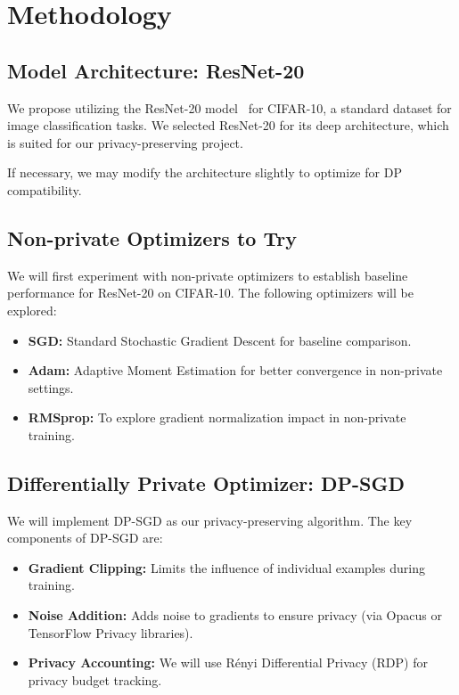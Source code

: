 \documentclass{article}
\begin{document}
    \section{Methodology}\label{sec:methodology}

    \subsection{Model Architecture: ResNet-20}\label{subsec:model-architecture:-resnet-20}

    We propose utilizing the ResNet-20 model~\citet{Idelbayev_ResNet20_CIFAR10} for CIFAR-10,
    a standard dataset for image classification tasks.
    We selected ResNet-20 for its deep architecture,
    which is suited for our privacy-preserving project.

    If necessary, we may modify the architecture slightly to optimize for DP compatibility.

    \subsection{Non-private Optimizers to Try}\label{subsec:non-private-optimizers-to-try}
    We will first experiment with non-private optimizers to establish baseline performance for ResNet-20 on CIFAR-10.
    The following optimizers will be explored:
    \begin{itemize}
        \item \textbf{SGD:} Standard Stochastic Gradient Descent for baseline comparison.
        \item \textbf{Adam:} Adaptive Moment Estimation for better convergence in non-private settings.
        \item \textbf{RMSprop:} To explore gradient normalization impact in non-private training.
    \end{itemize}

    \subsection{Differentially Private Optimizer: DP-SGD}\label{subsec:differentially-private-optimizer:-dp-sgd}
    We will implement DP-SGD as our privacy-preserving algorithm.
    The key components of DP-SGD are:
    \begin{itemize}
        \item \textbf{Gradient Clipping:} Limits the influence of individual examples during training.
        \item \textbf{Noise Addition:} Adds noise to gradients to ensure privacy (via Opacus or TensorFlow Privacy libraries).
        \item \textbf{Privacy Accounting:} We will use Rényi Differential Privacy (RDP) for privacy budget tracking.
    \end{itemize}
\end{document}
